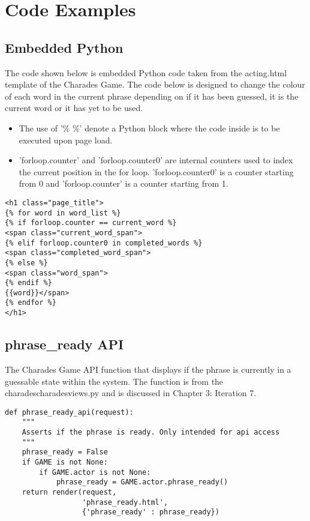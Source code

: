 \chapter{Code Examples}

\section{Embedded Python}

The code shown below is embedded Python code taken from the acting.html template of the Charades Game. The code below is designed to change the colour of each word in the current phrase depending on if it has been guessed, it is the current word or it has yet to be used.

\begin{itemize}
	\item The use of '{\% \%}' denote a Python block where the code inside is to be executed upon page load. 
	
	\item 'forloop.counter' and 'forloop.counter0' are internal counters used to index the current position in the for loop. 'forloop.counter0' is a counter starting from 0 and 'forloop.counter' is a counter starting from 1.

\end{itemize}

\begin{verbatim}
<h1 class="page_title">
{% for word in word_list %}
{% if forloop.counter == current_word %}
<span class="current_word_span">
{% elif forloop.counter0 in completed_words %}
<span class="completed_word_span">
{% else %}
<span class="word_span">
{% endif %}
{{word}}</span>
{% endfor %}
</h1>
\end{verbatim}

\section{phrase\_ready API}

The Charades Game API function that displays if the phrase is currently in a guessable state within the system. The function is from the charades\/charades\/views.py and is discussed in Chapter 3: Iteration 7.

\begin{verbatim}
def phrase_ready_api(request):
    """
    Asserts if the phrase is ready. Only intended for api access
    """
    phrase_ready = False
    if GAME is not None:
        if GAME.actor is not None:
            phrase_ready = GAME.actor.phrase_ready()
    return render(request,
    		      'phrase_ready.html',
    		      {'phrase_ready' : phrase_ready})
\end{verbatim}


